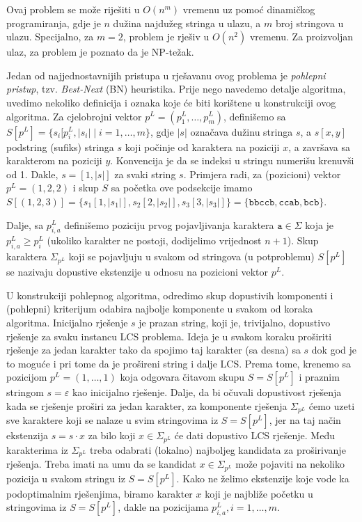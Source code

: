 \documentclass[a4paper, utf8, 11pt, colorlinks]{book}
\begin{document}
 
 Ovaj problem se može riješiti u $O(n^m)$ vremenu uz pomoć dinamičkog programiranja, gdje je $n$ dužina najdužeg stringa u ulazu, a $m$ broj stringova u ulazu. Specijalno, za  $m=2$, problem je rješiv u $O(n^2)$ vremenu. Za proizvoljan ulaz, za problem je poznato da je NP-težak.  


Jedan od najjednostavnijih pristupa u rješavanu ovog problema je  \emph{pohlepni pristup}, tzv. \emph{Best-Next} (BN) heuristika. Prije nego navedemo detalje algoritma, uvedimo nekoliko definicija i oznaka koje će biti korištene u konstrukciji ovog algoritma. Za cjelobrojni vektor $p^L = (p^L_1,\ldots, p^L_m)$, definišemo sa
$S[p^L] = \{s_i[p^L_i, |s_i| \mid i=1,\ldots,m\}$, gdje $|s|$ označava dužinu stringa $s$, a $s[x,y]$ podstring (sufiks) stringa $s$ koji počinje od karaktera na poziciji $x$, a završava sa karakterom na poziciji $y$. Konvencija je da se indeksi u stringu numerišu krenuvši od 1. Dakle, $s= [1, |s|]$ za svaki string $s$. Primjera radi, za (pozicioni) vektor $p^L=(1,2,2)$ i skup $S$ sa početka ove podsekcije imamo $S[ (1,2,3)] = \{ s_1[1, |s_1|], s_2[2, |s_2|], s_3[3, |s_3|]  \}= \{ \texttt{bbccb}, \texttt{ccab}, \texttt{bcb}\}$. 
 
Dalje, sa $p^L_{i,a}$ definišemo poziciju prvog pojavljivanja karaktera $\texttt{a}\in \Sigma$ koja je  $p^L_{i,a} \geq p^L_i$ (ukoliko karakter ne postoji, dodijelimo vrijednost $n+1$). Skup karaktera $\Sigma_{p^L}$ koji se pojavljuju u svakom od stringova (u potproblemu) $S[p^L]$ se nazivaju dopustive ekstenzije u odnosu na pozicioni vektor $p^L$. 

U konstrukciji pohlepnog algoritma, odredimo  skup dopustivih komponenti i (pohlepni) kriterijum odabira najbolje komponente u svakom od koraka algoritma. Inicijalno rješenje $s$ je prazan string, koji je, trivijalno, dopustivo rješenje za svaku instancu LCS problema. Ideja je u svakom koraku proširiti rješenje za jedan karakter tako da spojimo taj karakter (sa desna) sa $s$  dok god je to moguće i pri tome da je prošireni string i dalje LCS. Prema tome, krenemo sa pozicijom $p^L = (1, \ldots, 1)$ koja odgovara čitavom skupu $S=S[p^L]$ i praznim stringom $s =\varepsilon$ kao inicijalno rješenje. Dalje, da bi očuvali dopustivost rješenja kada se rješenje proširi za jedan karakter, za komponente rješenja $\Sigma_{p^L}$ ćemo uzeti sve karaktere koji se nalaze u svim stringovima iz $S=S[p^L]$, jer na taj način  ekstenzija $s = s \cdot x$ za bilo koji $x \in \Sigma_{p^L}$ će dati dopustivo LCS rješenje. Među karakterima iz $\Sigma_{p^L}$ treba odabrati (lokalno) najboljeg kandidata za proširivanje rješenja. Treba imati na umu da se kandidat $x\in \Sigma_{p^L}$ može pojaviti na nekoliko pozicija u svakom stringu iz $S=S[p^L]$. Kako ne želimo ekstenzije koje vode ka podoptimalnim rješenjima, biramo karakter $x$ koji je najbliže početku u stringovima iz $S=S[p^L]$, dakle na pozicijama $p^L_{i,a},i=1,\ldots,m$. 
\end{document}
